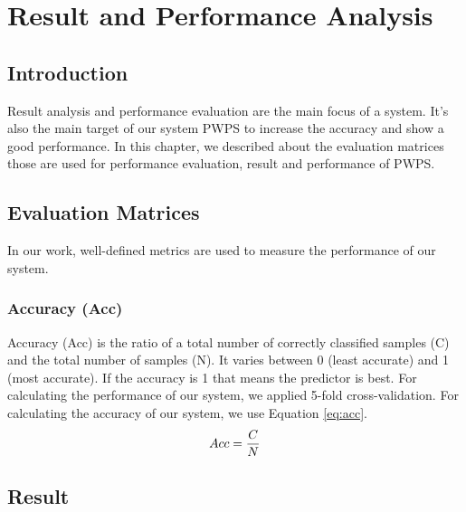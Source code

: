 \documentclass[document.tex]{subfiles}
\begin{document}
\chapter{Result and Performance Analysis}
\section{Introduction} Result analysis and performance evaluation are the main focus of a system. It's also the main target of our system PWPS to increase the accuracy and show a good performance. In this chapter, we described about the evaluation matrices those are used for performance evaluation, result and performance of PWPS.
\section{Evaluation Matrices} In our work, well-defined metrics are used to measure the performance of our system.
\subsection{Accuracy (Acc)} Accuracy (Acc) is the ratio of a total number of correctly classified samples (C) and the total number of samples (N). It varies between 0 (least accurate) and 1 (most accurate). If the accuracy is 1 that means the predictor is best. \noindent For calculating the performance of our system, we applied 5-fold cross-validation. For calculating the accuracy of our system, we use Equation \ref{eq:acc}.
\begin{equation}
Acc = {C \over N}
\label{eq:acc}
\end{equation}

\section{Result}
\end{document}
